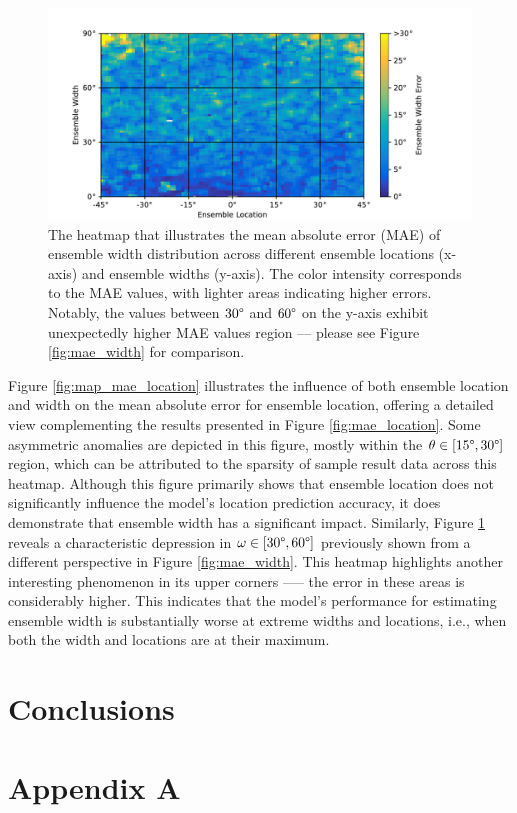 \documentclass{article}
\begin{document}
\begin{figure}[ht]
  \centering
  \includegraphics[width=\linewidth]{../figures/map_mae_width.pdf}
  \caption{\label{fig:map_mae_width}The heatmap that illustrates the mean absolute error (MAE) of ensemble width distribution across different ensemble locations (x-axis) and ensemble widths (y-axis). The color intensity corresponds to the MAE values, with lighter areas indicating higher errors. Notably, the values between $30\degree$ and $60\degree$ on the y-axis exhibit unexpectedly higher MAE values region --- please see Figure \ref{fig:mae_width} for comparison. }
\end{figure}

Figure \ref{fig:map_mae_location} illustrates the influence of both ensemble location and width on the mean absolute error for ensemble location, offering a detailed view complementing the results presented in Figure \ref{fig:mae_location}. Some asymmetric anomalies are depicted in this figure, mostly within the $\theta \in [15\degree, 30\degree]$ region, which can be attributed to the sparsity of sample result data across this heatmap. Although this figure primarily shows that ensemble location does not significantly influence the model's location prediction accuracy, it does demonstrate that ensemble width has a significant impact. Similarly, Figure \ref{fig:map_mae_width} reveals a characteristic depression in $\omega \in [30\degree, 60\degree]$ previously shown from a different perspective in Figure \ref{fig:mae_width}. This heatmap highlights another interesting phenomenon in its upper corners --— the error in these areas is considerably higher. This indicates that the model's performance for estimating ensemble width is substantially worse at extreme widths and locations, i.e., when both the width and locations are at their maximum.

\section{Conclusions}
\label{sec:conclusions}

\clearpage

\section*{Appendix A}
\label{appendix:a_hrtf}

\printbibliography
\end{document}
